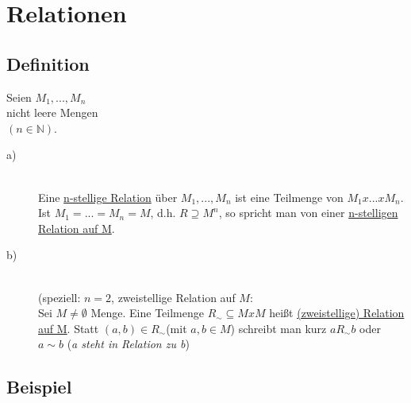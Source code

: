 \documentclass[a4paper, 12pt, twoside] {article}
\begin{document}
\section{Relationen}

\subsection{Definition}
Seien $M_1, ..., M_n$ \\
nicht leere Mengen \\
$(n \in \mathbb{N})$.

\begin{description}

\item[a)] \hfill \\
Eine \underline{n-stellige Relation} über $M_1, ..., M_n$ ist eine Teilmenge von $M_1 x ... x M_n$.
Ist $M_1 = ... = M_n = M$, d.h. $R \supseteq M^n$,
so spricht man von einer \underline{n-stelligen Relation auf M}.

\item[b)]  \hfill \\
(speziell: $n = 2$, zweistellige Relation auf $M$: \\
Sei $M \neq \emptyset$ Menge. Eine Teilmenge $R_{\sim} \subseteq M x M$ heißt \underline{(zweistellige) Relation auf M}. Statt $(a, b) \in R_{\sim} $(mit $a, b \in M$) schreibt man kurz $a R_{\sim} b$ oder $a \sim b$ (\textit{a steht in Relation zu b})

\end{description}

\subsection{Beispiel}
\end{document}
